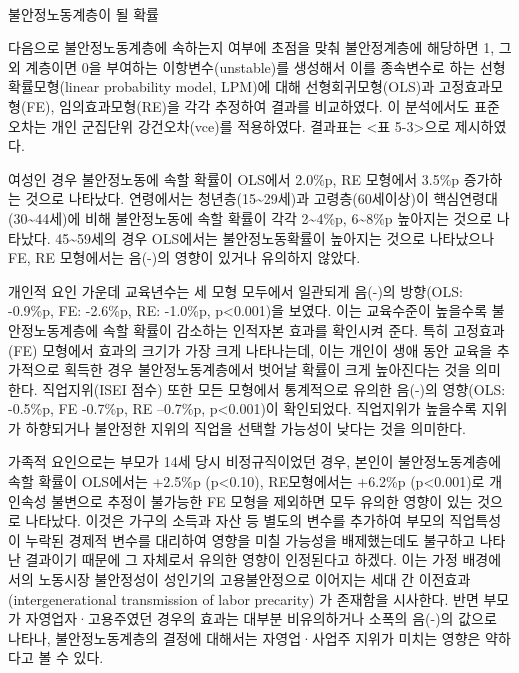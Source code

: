 \documentclass[
  letterpaper,
  DIV=11,
  numbers=noendperiod]{scrartcl}
\makeatletter
\let\oldparagraph\paragraph
\renewcommand{\paragraph}{
    \@ifstar
      \xxxParagraphStar
      \xxxParagraphNoStar
  }
\newcommand{\xxxParagraphStar}[1]{\oldparagraph*{#1}\mbox{}}
\newcommand{\xxxParagraphNoStar}[1]{\oldparagraph{#1}\mbox{}}
\makeatother
\begin{document}
\paragraph{불안정노동계층이 될
확률}\label{uxbd88uxc548uxc815uxb178uxb3d9uxacc4uxce35uxc774-uxb420-uxd655uxb960}

다음으로 불안정노동계층에 속하는지 여부에 초점을 맞춰 불안정계층에
해당하면 1, 그 외 계층이면 0을 부여하는 이항변수(unstable)를 생성해서
이를 종속변수로 하는 선형확률모형(linear probability model, LPM)에 대해
선형회귀모형(OLS)과 고정효과모형(FE), 임의효과모형(RE)을 각각 추정하여
결과를 비교하였다. 이 분석에서도 표준오차는 개인 군집단위
강건오차(vce)를 적용하였다. 결과표는 \textless 표 5-3\textgreater 으로
제시하였다.

여성인 경우 불안정노동에 속할 확률이 OLS에서 2.0\%p, RE 모형에서 3.5\%p
증가하는 것으로 나타났다. 연령에서는 청년층(15\textasciitilde29세)과
고령층(60세이상)이 핵심연령대(30\textasciitilde44세)에 비해 불안정노동에
속할 확률이 각각 2\textasciitilde4\%p, 6\textasciitilde8\%p 높아지는
것으로 나타났다. 45\textasciitilde59세의 경우 OLS에서는 불안정노동확률이
높아지는 것으로 나타났으나 FE, RE 모형에서는 음(-)의 영향이 있거나
유의하지 않았다.

개인적 요인 가운데 교육년수는 세 모형 모두에서 일관되게 음(-)의
방향(OLS: -0.9\%p, FE: -2.6\%p, RE: -1.0\%p, p\textless0.001)을 보였다.
이는 교육수준이 높을수록 불안정노동계층에 속할 확률이 감소하는 인적자본
효과를 확인시켜 준다. 특히 고정효과(FE) 모형에서 효과의 크기가 가장 크게
나타나는데, 이는 개인이 생애 동안 교육을 추가적으로 획득한 경우
불안정노동계층에서 벗어날 확률이 크게 높아진다는 것을 의미한다.
직업지위(ISEI 점수) 또한 모든 모형에서 통계적으로 유의한 음(-)의
영향(OLS: -0.5\%p, FE -0.7\%p, RE --0.7\%p, p\textless0.001)이
확인되었다. 직업지위가 높을수록 지위가 하향되거나 불안정한 지위의 직업을
선택할 가능성이 낮다는 것을 의미한다.

가족적 요인으로는 부모가 14세 당시 비정규직이었던 경우, 본인이
불안정노동계층에 속할 확률이 OLS에서는 +2.5\%p (p\textless0.10),
RE모형에서는 +6.2\%p (p\textless0.001)로 개인속성 불변으로 추정이
불가능한 FE 모형을 제외하면 모두 유의한 영향이 있는 것으로 나타났다.
이것은 가구의 소득과 자산 등 별도의 변수를 추가하여 부모의 직업특성이
누락된 경제적 변수를 대리하여 영향을 미칠 가능성을 배제했는데도 불구하고
나타난 결과이기 때문에 그 자체로서 유의한 영향이 인정된다고 하겠다. 이는
가정 배경에서의 노동시장 불안정성이 성인기의 고용불안정으로 이어지는
세대 간 이전효과(intergenerational transmission of labor precarity) 가
존재함을 시사한다. 반면 부모가 자영업자·고용주였던 경우의 효과는 대부분
비유의하거나 소폭의 음(-)의 값으로 나타나, 불안정노동계층의 결정에
대해서는 자영업·사업주 지위가 미치는 영향은 약하다고 볼 수 있다.
\end{document}
